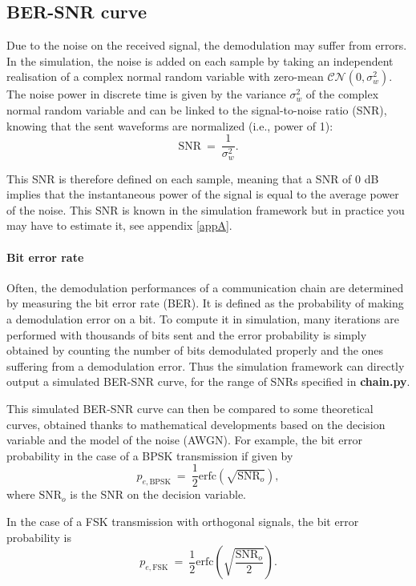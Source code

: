 \subsection{BER-SNR curve}
Due to the noise on the received signal, the demodulation may suffer from errors. In the simulation, the noise is added on each sample by taking an independent realisation of a complex normal random variable with zero-mean $\mathcal{CN}(0,\sigma_w^2)$. The noise power in discrete time is given by the variance $\sigma_w^2$ of the complex normal random variable and can be linked to the signal-to-noise ratio (SNR), knowing that the sent waveforms are normalized (i.e., power of 1):
\begin{equation*}
    \text{SNR}\:=\:\frac{1}{\sigma_w^2}.
\end{equation*}

This SNR is therefore defined on each sample, meaning that a SNR of 0 dB implies that the instantaneous power of the signal is equal to the average power of the noise. This SNR is known in the simulation framework but in practice you may have to estimate it, see appendix \ref{appA}.




\paragraph{Bit error rate}
Often, the demodulation performances of a communication chain are determined by measuring the bit error rate (BER). It is defined as the probability of making a demodulation error on a bit. To compute it in simulation, many iterations are performed with thousands of bits sent and the error probability is simply obtained by counting the number of bits demodulated properly and the ones suffering from a demodulation error. Thus the simulation framework can directly output a simulated BER-SNR curve, for the range of SNRs specified in \textbf{chain.py}.

This simulated BER-SNR curve can then be compared to some theoretical curves, obtained thanks to mathematical developments based on the decision variable and the model of the noise (AWGN). For example, the bit error probability in the case of a BPSK transmission if given by
\begin{equation*}
    p_{e,\text{BPSK}}\:=\:\frac{1}{2} \text{erfc}\left(\sqrt{\text{SNR}_o}\right),
\end{equation*}
where $\text{SNR}_o$ is the SNR on the decision variable.

In the case of a FSK transmission with orthogonal signals, the bit error probability is
\begin{equation*}
    p_{e,\text{FSK}}\:=\:\frac{1}{2} \text{erfc}\left(\sqrt{\frac{\text{SNR}_o}{2}}\right).
\end{equation*}

